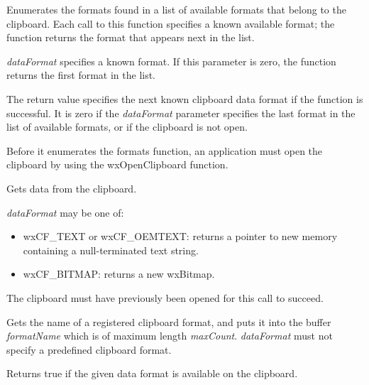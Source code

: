 
Enumerates the formats found in a list of available formats that belong
to the clipboard. Each call to this  function specifies a known
available format; the function returns the format that appears next in
the list.

{\it dataFormat} specifies a known format. If this parameter is zero,
the function returns the first format in the list.

The return value specifies the next known clipboard data format if the
function is successful. It is zero if the {\it dataFormat} parameter specifies
the last  format in the list of available formats, or if the clipboard
is not open.

Before it enumerates the formats function, an application must open the clipboard by using the
wxOpenClipboard function.


\label{wxgetclipboarddata}


Gets data from the clipboard.

{\it dataFormat} may be one of:

\begin{itemize}\itemsep=0pt
\item wxCF\_TEXT or wxCF\_OEMTEXT: returns a pointer to new memory containing a null-terminated text string.
\item wxCF\_BITMAP: returns a new wxBitmap.
\end{itemize}

The clipboard must have previously been opened for this call to succeed.


\label{wxgetclipboardformatname}


Gets the name of a registered clipboard format, and puts it into the buffer {\it formatName} which is of maximum
length {\it maxCount}. {\it dataFormat} must not specify a predefined clipboard format.


\label{wxisclipboardformatavailable}


Returns true if the given data format is available on the clipboard.


